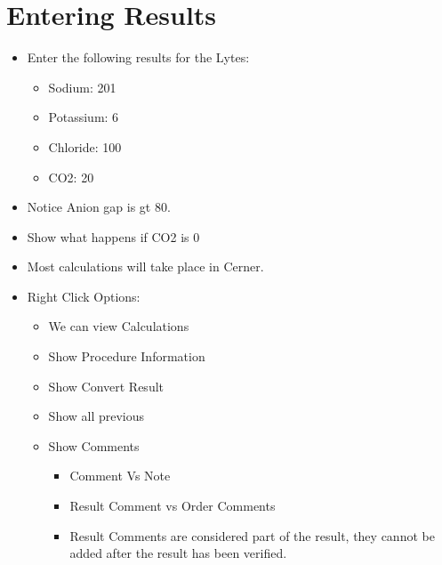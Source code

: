 \section{Entering Results}

\begin{itemize}
    \item Enter the following results for the Lytes:
    \begin{itemize}
        \item Sodium: 201
        \item Potassium: 6
        \item Chloride: 100
        \item CO2: 20
    \end{itemize}
\end{itemize}


\begin{itemize}
    \item Notice Anion gap is  gt 80.
    \item Show what happens if CO2 is 0
    \item Most calculations will take place in Cerner.
    \item Right Click Options:
    \begin{itemize}
        \item We can view Calculations
        \item Show Procedure Information
        \item Show Convert Result
        \item Show all previous
        \item Show Comments
        \begin{itemize}
            \item Comment Vs Note
            \item Result Comment vs Order Comments
            \item Result Comments are considered part of the result, they cannot be added after the result has been verified.
        \end{itemize}
    \end{itemize}
\end{itemize}


